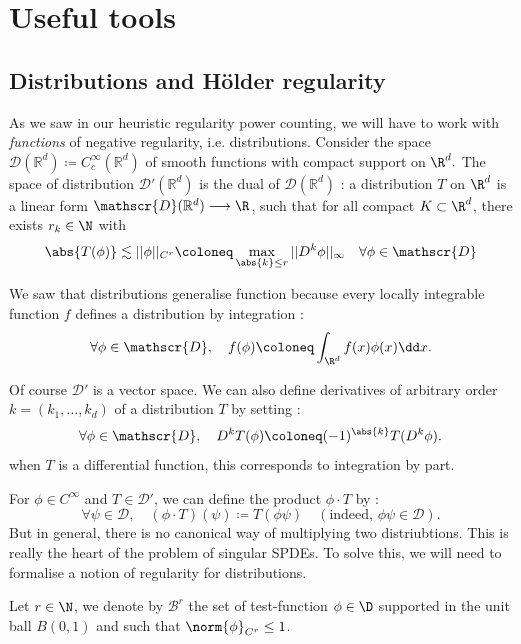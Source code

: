 \chapter{Useful tools}

\section{Distributions and Hölder regularity}

As we saw in our heuristic regularity power counting, we will have to work with \emph{functions} of negative regularity, i.e. distributions.
Consider the space $\mathscr{D}(\mathbb{R}^d) \coloneq C^{\infty}_c(\mathbb{R}^d)$ of smooth functions with compact support on $\R^d.$
The space of distribution $\mathscr{D}'(\mathbb{R}^d)$ is the dual of $\mathscr{D}(\mathbb{R}^d)$ : a distribution $T$ on $\R^d$ is a linear form $\mathscr{D}(\mathbb{R}^d) \longrightarrow \R$, 
such that for all compact $K \subset \R^d$, there exists $r_k \in \N$ with 
$$\abs{T(\phi)}\lesssim \vert \vert \phi \vert \vert_{C^r} \coloneq \max_{\abs{k}\leq r} \vert \vert D^k \phi \vert \vert_{\infty} \quad \forall \phi \in \mathscr{D} $$

We saw that distributions generalise function because every locally integrable function $f$ defines a distribution by integration :
$$\forall \phi \in \mathscr{D},\quad f(\phi) \coloneq \int_{\R^d} f(x)\phi(x) \dd x .$$

Of course $\mathscr{D}'$ is a vector space. We can also define derivatives of arbitrary order $k = (k_1, \dots, k_d)$ of a distribution $T$ by setting :
$$\forall \phi \in \mathscr{D},\quad D^k T(\phi) \coloneq (-1)^{\abs{k}}T(D^k \phi).$$
when $T$ is a differential function, this corresponds to integration by part.

For $\phi \in C^\infty$ and $T \in \mathscr{D}'$, we can define the product $\phi \cdot T$ by :
$$\forall \psi \in \mathscr{D},\quad (\phi \cdot T) (\psi) \coloneq T(\phi \psi) \quad ( \text{indeed, }\phi \psi \in \mathscr{D}).$$
But in general, there is no canonical way of multiplying two distriubtions. This is really the heart of the problem of singular SPDEs.
To solve this, we will need to formalise a notion of regularity for distributions.

\begin{remark}
    Let $r\in \N$, we denote by $\mathcal{B}^r$ the set of test-function $\phi\in \D$ supported in the unit ball $B(0,1)$ and such that $\norm{\phi}_{C^r}\leq 1$.
\end{remark}

